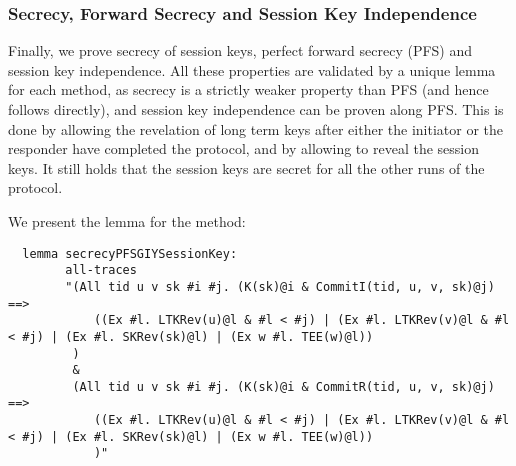  
\subsubsection{Secrecy, Forward Secrecy and Session Key Independence}

Finally, we prove secrecy of session keys, perfect forward secrecy
(PFS) and session key independence.
%
All these properties are validated by a unique lemma for each method,
as secrecy is a strictly weaker property than PFS (and hence follows
directly), and session key independence can be proven along PFS.
%
This is done by allowing the revelation of long term keys after either
the initiator or the responder have completed the protocol, and by
allowing to reveal the session keys.
%
It still holds that the session keys are secret for all the other runs
of the protocol.

We present the lemma for the \mSigStat{} method:
\begin{lstlisting}
  lemma secrecyPFSGIYSessionKey:
        all-traces
        "(All tid u v sk #i #j. (K(sk)@i & CommitI(tid, u, v, sk)@j) ==>
            ((Ex #l. LTKRev(u)@l & #l < #j) | (Ex #l. LTKRev(v)@l & #l < #j) | (Ex #l. SKRev(sk)@l) | (Ex w #l. TEE(w)@l))
         )
         &
         (All tid u v sk #i #j. (K(sk)@i & CommitR(tid, u, v, sk)@j) ==>
            ((Ex #l. LTKRev(u)@l & #l < #j) | (Ex #l. LTKRev(v)@l & #l < #j) | (Ex #l. SKRev(sk)@l) | (Ex w #l. TEE(w)@l))
            )"
\end{lstlisting}

